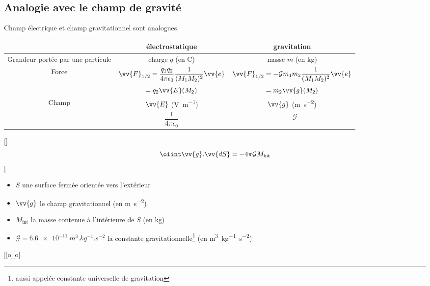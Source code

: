 

\subsection{Analogie avec le champ de gravité}

Champ électrique et champ gravitationnel sont analogues.

\begin{center}
    \begin{tabular}{c|c|c}
        & électrostatique & gravitation\\
        \hline
        Grandeur portée par une particule & charge $q$ (en \unit{C}) & masse $m$ (en \unit{kg})\\[.5cm]
        Force & $\vv{F}_{1/2}=\dfrac{q_1q_2}{4\pi\epsilon_0}\dfrac{1}{(M_1M_2)^2}\vv{e}$ & $\vv{F}_{1/2}=-\mathcal{G}m_1m_2\dfrac{1}{(M_1M_2)^2}\vv{e}$\\[.5cm]
        & $=q_2\vv{E}(M_2)$ & $=m_2\vv{g}(M_2)$\\[.5cm]
        Champ & $\vv{E}$ (\unit{V.m^{-1}}) & $\vv{g}$ (\unit{m.s^{-2}})\\[.2cm]
        & $\dfrac{1}{4\pi\epsilon_0}$ & $-\mathcal{G}$
    \end{tabular}
\end{center}

[]
{$$\oiint\vv{g}.\vv{dS}=-4\pi\mathcal{G}M_\text{int}$$}
[
    \begin{itemize}
        \item $S$ une surface fermée orientée vers l'extérieur
        \item $\vv{g}$ le champ gravitationnel (en \unit{m.s^{-2}})
        \item $M_\text{int}$ la masse contenue à l'intérieure de $S$ (en \unit{kg})
        \item $\mathcal{G}=\SI{6.6e-11}{m^3.kg^{-1}.s^{-2}}$ la constante gravitationnelle\footnote{aussi appelée constante universelle de gravitation} (en \unit{m^3.kg^{-1}.s^{-2}})
    \end{itemize}
][o][o]

